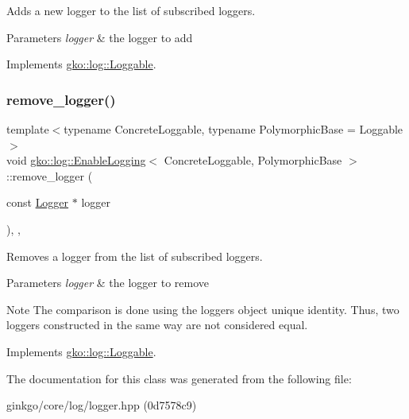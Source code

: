 Adds a new logger to the list of subscribed loggers. 


\begin{DoxyParams}{Parameters}
{\em logger} & the logger to add \\
\hline
\end{DoxyParams}


Implements \hyperlink{classgko_1_1log_1_1Loggable_aa2bb887b5ef7e75fa1a30ee1896ed932}{gko\+::log\+::\+Loggable}.

\mbox{\label{classgko_1_1log_1_1EnableLogging_aba5317f8a03956a61d770e9b07fc65cc}} 
\subsubsection{\texorpdfstring{remove\+\_\+logger()}{remove\_logger()}}
{\footnotesize\ttfamily template$<$typename Concrete\+Loggable, typename Polymorphic\+Base = Loggable$>$ \\
void \hyperlink{classgko_1_1log_1_1EnableLogging}{gko\+::log\+::\+Enable\+Logging}$<$ Concrete\+Loggable, Polymorphic\+Base $>$\+::remove\+\_\+logger (\begin{DoxyParamCaption}\item[{const \hyperlink{classgko_1_1log_1_1Logger}{Logger} $\ast$}]{logger }\end{DoxyParamCaption})\hspace{0.3cm}{\ttfamily [inline]}, {\ttfamily [override]}, {\ttfamily [virtual]}}



Removes a logger from the list of subscribed loggers. 


\begin{DoxyParams}{Parameters}
{\em logger} & the logger to remove\\
\hline
\end{DoxyParams}
\begin{DoxyNote}{Note}
The comparison is done using the logger\textquotesingle{}s object unique identity. Thus, two loggers constructed in the same way are not considered equal. 
\end{DoxyNote}


Implements \hyperlink{classgko_1_1log_1_1Loggable_a5de4092a74cf04f30f13636d49aaec8b}{gko\+::log\+::\+Loggable}.



The documentation for this class was generated from the following file\+:\begin{DoxyCompactItemize}
\item 
ginkgo/core/log/logger.\+hpp (0d7578c9)\end{DoxyCompactItemize}
